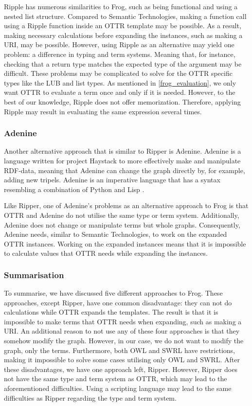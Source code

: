 \para
Ripple has numerous similarities to Frog, such as being functional and using a nested list structure. Compared to Semantic Technologies, making a function call using a Ripple function inside an OTTR template may be possible. As a result, making necessary calculations before expanding the instances, such as making a URI, may be possible. However, using Ripple as an alternative may yield one problem: a difference in typing and term systems. Meaning that, for instance, checking that a return type matches the expected type of the argument may be difficult. These problems may be complicated to solve for the OTTR specific types like the LUB and list types.  As mentioned in \autoref{frog_evaluation}, we only want OTTR to evaluate a term once and only if it is needed. However, to the best of our knowledge, Ripple does not offer memorization. Therefore, applying Ripple may result in evaluating the same expression several times.   

\subsubsection{Adenine}
Another alternative approach that is similar to Ripper is Adenine. Adenine is a language written for project Haystack to more effectively make and manipulate RDF-data, meaning that Adenine can change the graph directly by, for example, adding new tripels. Adenine is an imperative language that has a syntax resembling a combination of Python and Lisp \autocite{Adenine}.

\para
Like Ripper, one of Adenine's problems as an alternative approach to Frog is that OTTR and Adenine do not utilise the same type or term system. Additionally, Adenine does not change or manipulate terms but whole graphs. Consequently, Adenine needs, similar to Semantic Technologies, to work on the expanded OTTR instances. Working on the expanded instances means that it is impossible to calculate values that OTTR needs while expanding the instances. 

\subsubsection{Summarisation}
To summarise, we have discussed five different approaches to Frog. These approaches, except Ripper, have one common disadvantage: they can not do calculations while OTTR expands the templates. The result is that it is impossible to make terms that OTTR needs when expanding, such as making a URI. An additional reason to not use any of these four approaches is that they somehow modify the graph. However, in our case, we do not want to modify the graph, only the terms. Furthermore, both OWL and SWRL have restrictions, making it impossible to solve some cases utilising only OWL and SWRL. After these disadvantages, we have one approach left, Ripper. However, Ripper does not have the same type and term system as OTTR, which may lead to the aforementioned difficulties. Using a scripting language may lead to the same difficulties as Ripper regarding the type and term system. 


